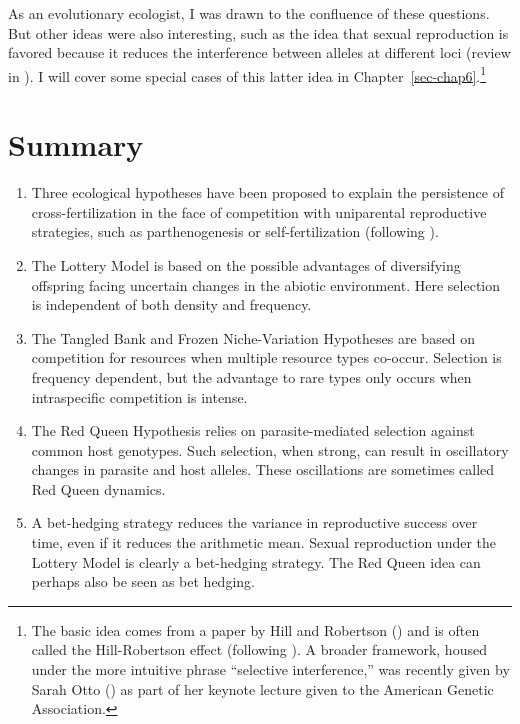 \documentclass[
  american,
  letterpaper,
]{book}
\providecommand{\tightlist}{%
  \setlength{\itemsep}{0pt}\setlength{\parskip}{0pt}}\usepackage{longtable,booktabs,array}
\begin{document}
As an evolutionary ecologist, I was drawn to the confluence of these
questions. But other ideas were also interesting, such as the idea that
sexual reproduction is favored because it reduces the interference
between alleles at different loci (review in
). I will cover some special cases of
this latter idea in Chapter~\ref{sec-chap6}.\footnote{The basic idea
  comes from a paper by Hill and Robertson
  () and is often called the
  Hill-Robertson effect (following
  ). A broader
  framework, housed under the more intuitive phrase ``selective
  interference,'' was recently given by Sarah Otto
  () as part of her keynote lecture given
  to the American Genetic Association.}

\section{Summary}\label{summary-1}

\begin{enumerate}
\def\labelenumi{\arabic{enumi}.}
\tightlist
\item
  Three ecological hypotheses have been proposed to explain the
  persistence of cross-fertilization in the face of competition with
  uniparental reproductive strategies, such as parthenogenesis or
  self-fertilization (following ).
\item
  The Lottery Model is based on the possible advantages of diversifying
  offspring facing uncertain changes in the abiotic environment. Here
  selection is independent of both density and frequency.
\item
  The Tangled Bank and Frozen Niche-Variation Hypotheses are based on
  competition for resources when multiple resource types co-occur.
  Selection is frequency dependent, but the advantage to rare types only
  occurs when intraspecific competition is intense.
\item
  The Red Queen Hypothesis relies on parasite-mediated selection against
  common host genotypes. Such selection, when strong, can result in
  oscillatory changes in parasite and host alleles. These oscillations
  are sometimes called Red Queen dynamics.
\item
  A bet-hedging strategy reduces the variance in reproductive success
  over time, even if it reduces the arithmetic mean. Sexual reproduction
  under the Lottery Model is clearly a bet-hedging strategy. The Red
  Queen idea can perhaps also be seen as bet hedging.
\end{enumerate}
\end{document}
